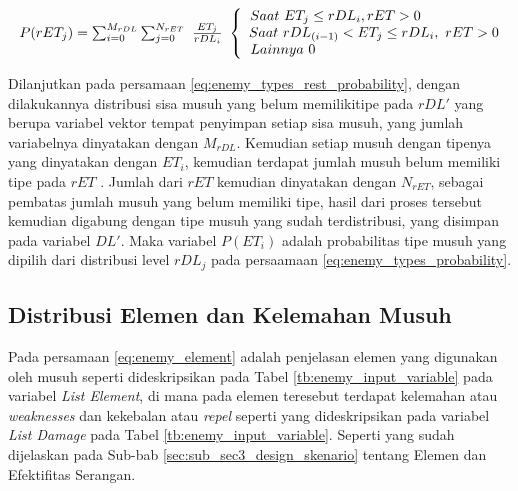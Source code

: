 \begin{equation}\label{eq:enemy_types_rest_probability}
\resizebox{\columnwidth}{!}{%
	$P(rET_{j}) = \sum_{i = 0}^{M_{rDL}} \sum_{j = 0}^{N_{rET}}\ \frac{ET_{j}}{rDL_{i}}\
	\left\{\begin{matrix}
	\hspace{-5.0em} Saat\ ET_{j} \leq rDL_{i}, rET > 0\\
	\hspace{0.5em} Saat\ rDL_{(i-1)} < ET_{j} \leq rDL_{i},\ rET > 0\\
	\hspace{-12.5em} Lainnya\ 0
	\end{matrix}\right.$%
}
\end{equation}

Dilanjutkan pada persamaan \ref{eq:enemy_types_rest_probability}, dengan dilakukannya distribusi sisa musuh yang belum memilikitipe pada $rDL'$ yang berupa variabel vektor tempat penyimpan setiap sisa musuh, yang jumlah variabelnya dinyatakan dengan $M_{rDL}$. Kemudian setiap musuh dengan tipenya yang dinyatakan dengan $ET_{i}$, kemudian terdapat jumlah musuh belum memiliki tipe pada $rET$ . Jumlah dari $rET$ kemudian dinyatakan dengan $N_{rET}$, sebagai pembatas jumlah musuh yang belum memiliki tipe, hasil dari proses tersebut kemudian digabung dengan tipe musuh yang sudah terdistribusi, yang disimpan pada variabel $DL'$. Maka variabel $P(ET_{i})$ adalah probabilitas tipe musuh yang dipilih dari distribusi level $rDL_{j}$ pada persaamaan \ref{eq:enemy_types_probability}.
\vspace{1ex}

\subsection{Distribusi Elemen dan Kelemahan Musuh}
\label{sec:sub_sec3_enemy_weak}
\vspace{1ex}

Pada persamaan \ref{eq:enemy_element} adalah penjelasan elemen yang digunakan oleh musuh seperti dideskripsikan pada Tabel \ref{tb:enemy_input_variable} pada variabel \textit{List Element}, di mana pada elemen teresebut terdapat kelemahan atau \textit{weaknesses} dan kekebalan atau \textit{repel} seperti yang dideskripsikan pada variabel \textit{List Damage} pada Tabel \ref{tb:enemy_input_variable}. Seperti yang sudah dijelaskan pada Sub-bab \ref{sec:sub_sec3_design_skenario} tentang Elemen dan Efektifitas Serangan. 
\vspace{1ex}

